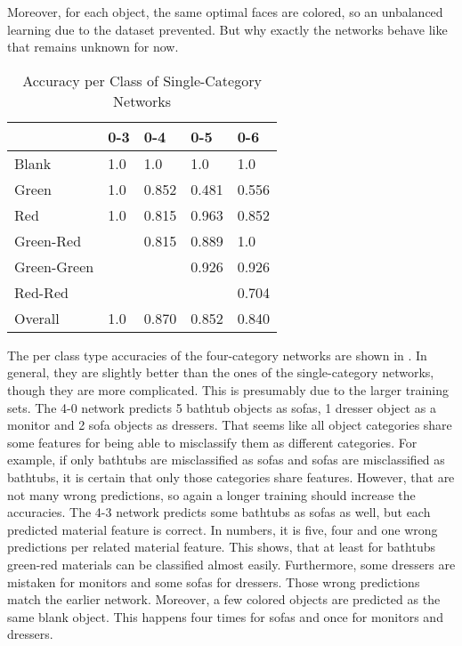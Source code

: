 Moreover, for each object, the same optimal faces are colored, so an unbalanced learning due to the dataset prevented.
But why exactly the networks behave like that remains unknown for now. 
\begin{table}[]
	\centering
	\caption{Accuracy per Class of Single-Category Networks}
	\label{tab:single-category-accuracies}
	\begin{tabular}{l|llll}
		            & 0-3 & 0-4   & 0-5   & 0-6   \\ \hline
		Blank       & 1.0 & 1.0   & 1.0   & 1.0   \\
		Green       & 1.0 & 0.852 & 0.481 & 0.556 \\
		Red         & 1.0 & 0.815 & 0.963 & 0.852 \\
		Green-Red   &     & 0.815 & 0.889 & 1.0   \\
		Green-Green &     &       & 0.926 & 0.926 \\
		Red-Red     &     &       &       & 0.704 \\ \hline
		Overall		& 1.0 & 0.870 & 0.852 & 0.840 \\
	\end{tabular}
\end{table}
The per class type accuracies of the four-category networks are shown in .
In general, they are slightly better than the ones of the single-category networks, though they are more complicated.
This is presumably due to the larger training sets.
The 4-0 network predicts 5 bathtub objects as sofas, 1 dresser object as a monitor and 2 sofa objects as dressers.
That seems like all object categories share some features for being able to misclassify them as different categories.
For example, if only bathtubs are misclassified as sofas and sofas are misclassified as bathtubs, it is certain that only those categories share features.
However, that are not many wrong predictions, so again a longer training should increase the accuracies.
The 4-3 network predicts some bathtubs as sofas as well, but each predicted material feature is correct.
In numbers, it is five, four and one wrong predictions per related material feature.
This shows, that at least for bathtubs green-red materials can be classified almost easily.
Furthermore, some dressers are mistaken for monitors and some sofas for dressers.
Those wrong predictions match the earlier network.
Moreover, a few colored objects are predicted as the same blank object.
This happens four times for sofas and once for monitors and dressers.
